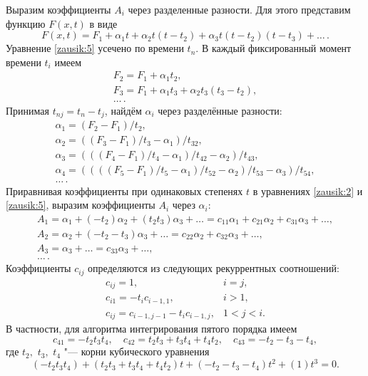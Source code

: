 Выразим коэффициенты $A_i$ через разделенные разности. 
Для этого представим функцию $F(x,t)$ в виде 
\begin{equation}
 F(x,t)=F_1+\alpha_1 t +\alpha_2 t (t-t_2) + \alpha_3 t (t-t_2)(t-t_3)+\dots  \,.	
\label{zausik:5}
\end{equation}
Уравнение \eqref{zausik:5} усечено по времени $t_n$. В каждый фиксированный момент времени $t_i$ имеем
\begin{equation}
\begin{array}{l}
F_2=F_1+\alpha_1 t_2,\\
F_3=F_1+\alpha_1 t_3+\alpha_2 t_3(t_3-t_2),\\
\dots\,.
\end{array}
\label{zausik:6}
\end{equation}
Принимая $t_{nj}=t_n-t_j$, найдём $\alpha_i$ через разделённые разности:
\begin{equation}
\begin{array}{l}
\alpha_1=(F_2-F_1)/t_2,\\
\alpha_2=((F_3-F_1)/t_3-\alpha_1)/t_{32},\\
\alpha_3=(((F_4-F_1)/t_4-\alpha_1)/t_{42}-\alpha_2)/t_{43},\\
\alpha_4=((((F_5-F_1)/t_5-\alpha_1)/t_{52}-\alpha_2)/t_{53}-\alpha_3)/t_{54},\\	
\dots\,.
\end{array}
\label{zausik:7}
\end{equation}
Приравнивая коэффициенты при одинаковых степенях $t$ в уравнениях \eqref{zausik:2} и \eqref{zausik:5}, выразим коэффициенты $A_i$ через $\alpha_i$:
\begin{equation}
\begin{array}{l}
A_1=\alpha_1+(-t_2)\alpha_2+(t_2 t_3)\alpha_3+\dots =c_{11}\alpha_1+c_{21}\alpha_2+c_{31}\alpha_3+\dots ,\\
A_2=\alpha_2+(-t_2-t_3)\alpha_3+\dots =c_{22}\alpha_2+c_{32}\alpha_3+\dots ,\\
A_3=\alpha_3+\dots =c_{33}\alpha_3+\dots ,\\	
\dots\,.
\end{array}
\label{zausik:8}
\end{equation}
Коэффициенты $c_{ij}$ определяются из следующих рекуррентных соотношений:
\begin{equation}
\begin{array}{ll}
c_{ij}=1,& i=j,\\
c_{i1}=-t_i c_{i-1,1}, & i>1,\\
c_{ij}=c_{i-1,j-1}-t_i c_{i-1,j}, & 1<j<i.
\end{array}
\label{zausik:9}
\end{equation}
В частности, для алгоритма интегрирования пятого порядка имеем
\begin{equation}
\label{zausik:10}
c_{41}=-t_2 t_3 t_4, \quad c_{42}=t_2 t_3+t_3 t_4+t_4 t_2, \quad  
c_{43}=-t_2-t_3-t_4,	
\end{equation}
где $t_2,$ $t_3,$ $t_4$ "--- корни кубического уравнения
\begin{equation}
\label{zausik:11}
(-t_2 t_3 t_4)+( t_2 t_3+t_3 t_4+t_4 t_2)t+(-t_2-t_3-t_4)t^2+(1)t^3=0.
\end{equation}

